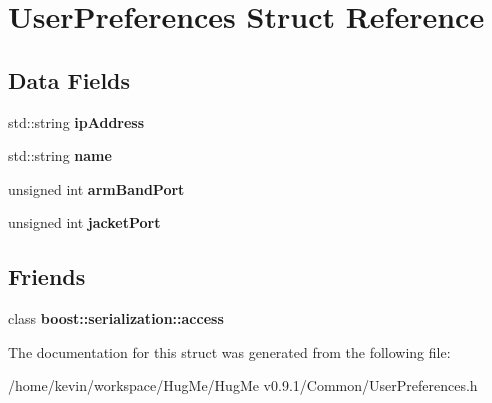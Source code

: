 \hypertarget{structUserPreferences}{
\section{UserPreferences Struct Reference}
\label{structUserPreferences}
}
\subsection*{Data Fields}
\begin{DoxyCompactItemize}
\item 
\hypertarget{structUserPreferences_a2b7225f2ddf069be9e4f23f426409020}{
std::string {\bfseries ipAddress}}
\label{structUserPreferences_a2b7225f2ddf069be9e4f23f426409020}

\item 
\hypertarget{structUserPreferences_a38d4e509e3d15d642d5e9517ddffd77e}{
std::string {\bfseries name}}
\label{structUserPreferences_a38d4e509e3d15d642d5e9517ddffd77e}

\item 
\hypertarget{structUserPreferences_ac8d206952bf8799e05dbd99ec4bc4a33}{
unsigned int {\bfseries armBandPort}}
\label{structUserPreferences_ac8d206952bf8799e05dbd99ec4bc4a33}

\item 
\hypertarget{structUserPreferences_ad4bc7a7d5215b907953d7a0877dd2dec}{
unsigned int {\bfseries jacketPort}}
\label{structUserPreferences_ad4bc7a7d5215b907953d7a0877dd2dec}

\end{DoxyCompactItemize}
\subsection*{Friends}
\begin{DoxyCompactItemize}
\item 
\hypertarget{structUserPreferences_ac98d07dd8f7b70e16ccb9a01abf56b9c}{
class {\bfseries boost::serialization::access}}
\label{structUserPreferences_ac98d07dd8f7b70e16ccb9a01abf56b9c}

\end{DoxyCompactItemize}


The documentation for this struct was generated from the following file:\begin{DoxyCompactItemize}
\item 
/home/kevin/workspace/HugMe/HugMe v0.9.1/Common/UserPreferences.h\end{DoxyCompactItemize}
